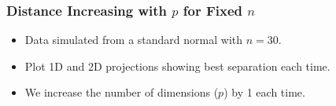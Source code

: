 \documentclass{beamer}
\begin{document}
\begin{frame}
\frametitle{Distance Increasing with $p$ for Fixed $n$}
\begin{itemize}
\item Data simulated from a standard normal with $n=30$. 
\item Plot 1D and 2D projections showing best separation each time. 
\item We increase the number of dimensions ($p$) by 1 each time. %
\end{itemize}
\begin{center}

\end{center}
\end{frame}
\end{document}
